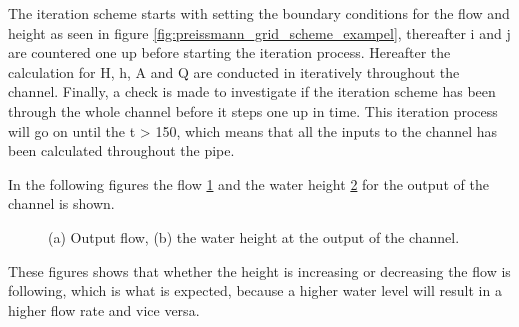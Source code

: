 The iteration scheme starts with setting the boundary conditions for the flow and height as seen in figure \ref{fig:preissmann_grid_scheme_exampel}, thereafter i and j are countered one up before starting the iteration process. Hereafter the calculation for H, h, A and Q are conducted in iteratively throughout the channel. Finally, a check is made to investigate if the iteration scheme has been through the whole channel before it steps one up in time. This iteration process will go on until the t > 150, which means that all the inputs to the channel has been calculated throughout the pipe.   

In the following figures the flow \ref{fig:simulation_output_flow_height_a} and the water height \ref{fig:simulation_output_flow_height_b} for the output of the channel is shown.


\begin{figure}[H]
\centering
\begin{subfigure}{.5\textwidth}
  \centering
  
  \caption{}
  \label{fig:simulation_output_flow_height_a}
\end{subfigure}%
\begin{subfigure}{.4\textwidth}
  \centering
 
  \caption{}
   \label{fig:simulation_output_flow_height_b}
\end{subfigure}
\caption{(a) Output flow, (b) the water height at the output of the channel.}
\label{fig:simulation_output_flow_height}
\end{figure}
These figures shows that whether the height is increasing or decreasing the flow is following, which is what is expected, because a higher water level will result in a higher flow rate and vice versa.
